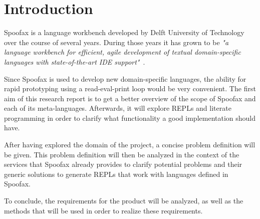 \section*{Introduction}
\label{sec:introduction}

Spoofax is a language workbench developed by Delft University of Technology over
the course of several years. During those years it has grown to be \textit{"a
language workbench for efficient, agile development of textual domain-specific
languages with state-of-the-art IDE support"}~\cite{Kats10a}.

Since Spoofax is used to develop new domain-specific languages, the ability for
rapid prototyping using a read-eval-print loop would be very convenient.  The
first aim of this research report is to get a better overview of the scope of
Spoofax and each of its meta-languages. Afterwards, it will explore REPLs and
literate programming in order to clarify what functionality a good
implementation should have.

After having explored the domain of the project, a concise problem definition
will be given. This problem definition will then be analyzed in the context of
the services that Spoofax already provides to clarify potential problems and
their generic solutions to generate REPLs that work with languages defined in
Spoofax.

To conclude, the requirements for the product will be analyzed, as well as the
methods that will be used in order to realize these requirements.

